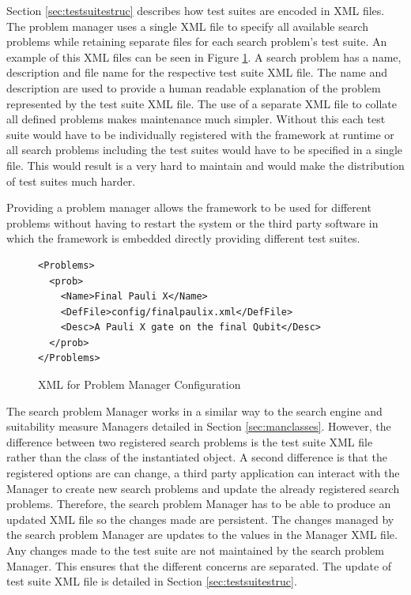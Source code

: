 Section \ref{sec:testsuitestruc} describes how test suites are encoded in XML files.
The problem manager uses a single XML file to specify all available search problems while retaining separate files for each search problem's test suite.
An example of this XML files can be seen in Figure \ref{code:probmanconfig}.
A search problem has a name, description and file name for the respective test suite XML file.
The name and description are used to provide a human readable explanation of the problem represented by the test suite XML file.
The use of a separate XML file to collate all defined problems makes maintenance much simpler.
Without this each test suite would have to be individually registered with the framework at runtime or all search problems including the test suites would have to be specified in a single file.
This would result is a very hard to maintain and would make the distribution of test suites much harder.

Providing a problem manager allows the framework to be used for different problems without having to restart the system or the third party software in which the framework is embedded directly providing different test suites.

\lstset{language=XML}
\begin{figure}
\begin{lstlisting}
<Problems>
  <prob>
    <Name>Final Pauli X</Name>
    <DefFile>config/finalpaulix.xml</DefFile>
    <Desc>A Pauli X gate on the final Qubit</Desc>
  </prob>
</Problems>
\end{lstlisting}
\caption{XML for Problem Manager Configuration}
\label{code:probmanconfig}
\end{figure}

The search problem Manager works in a similar way to the search engine and suitability measure Managers detailed in Section \ref{sec:manclasses}.
However, the difference between two registered search problems is the test suite XML file rather than the class of the instantiated object.
A second difference is that the registered options are can change, a third party application can interact with the Manager to create new search problems and update the already registered search problems.
Therefore, the search problem Manager has to be able to produce an updated XML file so the changes made are persistent.
The changes managed by the search problem Manager are updates to the values in the Manager XML file.
Any changes made to the test suite are not maintained by the search problem Manager.
This ensures that the different concerns are separated.
The update of test suite XML file is detailed in Section \ref{sec:testsuitestruc}.

